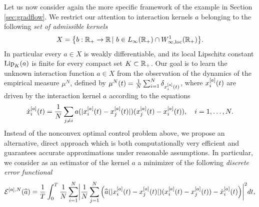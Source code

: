 Let us now consider again the more specific framework of the example in Section \ref{sec:gradflow}. We restrict our attention to interaction kernels $a$ belonging to the following \textit{set of admissible kernels}
\begin{align*}
	X=\bigl\{b:\mathbb{R}_+\rightarrow\mathbb{R}\,|\ b \in L_{\infty}(\mathbb{R}_+) \cap W^{1}_{\infty,\textup{loc}}(\mathbb{R}_+) \bigr \}.
\end{align*}
In particular every $a \in X$ is weakly differentiable, and its local Lipschitz constant $\textup{Lip}_{K}(a)$ is finite for every compact set $K \subset \mathbb{R}_+$.
Our goal is to learn the unknown interaction function $a \in X$ from the observation of the dynamics of the empirical measure $\mu^N$, defined by $\mu^N(t)=\frac{1}{N} \sum_{i=1}^N \delta_{x^{[a]}_i(t)}$, where $x^{[a]}_i(t)$ are driven by the interaction kernel $a$ according to the equations 
\begin{equation}\label{fdgradientflow2}
\dot{x}^{[a]}_i(t) = \frac{1}{N} \sum_{j \neq i} a(| x^{[a]}_i(t) -  x^{[a]}_j(t) |) (x^{[a]}_j(t) - x^{[a]}_i(t)), \quad i=1,\dots,N.
\end{equation}
Instead of the nonconvex optimal control problem above, we propose an alternative, direct approach which is both computationally very efficient and guarantees accurate approximations under reasonable assumptions.
In particular, we consider as an estimator of the kernel $a$ a minimizer of the following \textit{discrete error functional}
\begin{align}\label{eq-def-error1}
	\begin{split}
	\mathcal E^{[a],N}(\widehat a) = \frac{1}{T}\int_0^T\frac{1}{N}\sum_{i=1}^N\biggl|\frac{1}{N}\sum_{j=1}^N
			\left(\widehat a(|x^{[a]}_i(t)-x^{[a]}_j(t)|)(x^{[a]}_i(t) - x^{[a]}_j(t))-\dot{x}^{[a]}_i(t)\right)\biggr|^2 dt,
	\end{split}
\end{align}
